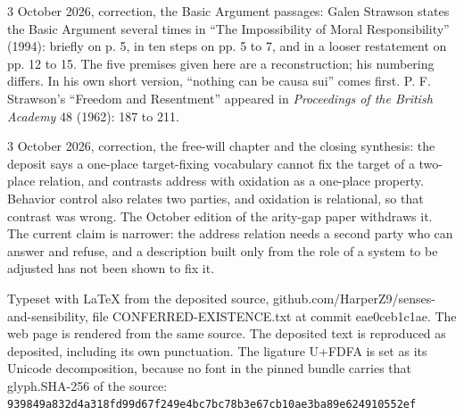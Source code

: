 \documentclass[11pt]{article}
\begin{document}
3 October 2026, correction, the Basic Argument passages: Galen Strawson states the Basic Argument several times in ``The Impossibility of Moral Responsibility'' (1994): briefly on p. 5, in ten steps on pp. 5 to 7, and in a looser restatement on pp. 12 to 15. The five premises given here are a reconstruction; his numbering differs. In his own short version, ``nothing can be causa sui'' comes first. P. F. Strawson's ``Freedom and Resentment'' appeared in \emph{Proceedings of the British Academy} 48 (1962): 187 to 211.

3 October 2026, correction, the free-will chapter and the closing synthesis: the deposit says a one-place target-fixing vocabulary cannot fix the target of a two-place relation, and contrasts address with oxidation as a one-place property. Behavior control also relates two parties, and oxidation is relational, so that contrast was wrong. The October edition of the arity-gap paper withdraws it. The current claim is narrower: the address relation needs a second party who can answer and refuse, and a description built only from the role of a system to be adjusted has not been shown to fix it.

\vfill{\footnotesize Typeset with LaTeX from the deposited source, github.com/HarperZ9/senses-and-sensibility, file CONFERRED-EXISTENCE.txt at commit eae0ceb1c1ae. The web page is rendered from the same source. The deposited text is reproduced as deposited, including its own punctuation. The ligature U+FDFA is set as its Unicode decomposition, because no font in the pinned bundle carries that glyph.\newline SHA-256 of the source: \texttt{939849a832d4a318fd99d67f249e4bc7bc78b3e67cb10ae3ba89e624910552ef}\par}
\end{document}

